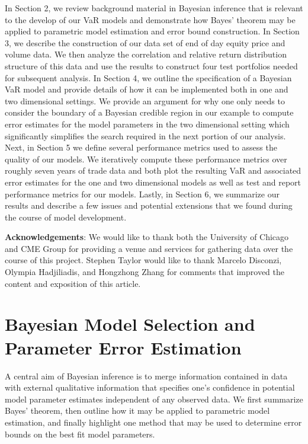 \documentclass{amsart}
\begin{document}
In Section 2, we review background material in Bayesian inference that is relevant to
the develop of our VaR models and demonstrate how Bayes' theorem 
may be applied to parametric model estimation and error bound construction. 
In Section 3, we describe the construction of our data set of 
end of day equity price and volume data.  We then analyze the correlation and relative return 
distribution structure of this 
data and use the results to construct four test portfolios needed for subsequent analysis. 
In Section 4, we outline the specification of a Bayesian VaR model and provide details 
of how it can be implemented both in one and two dimensional settings.  We provide an argument 
for why one only needs to consider the boundary of a Bayesian credible region in our example 
to compute error estimates for the model parameters in the two dimensional setting which significantly 
simplifies the search required in the next portion of our analysis.
Next, in Section 5 we define several performance metrics used to 
assess the quality of our models.  We iteratively compute these performance metrics 
over roughly seven years of trade data and both plot the resulting VaR and associated 
error estimates for the one and two dimensional models as well as test and report   
 performance metrics for our models. Lastly, in Section 6, we summarize our results and 
describe a few issues and potential extensions that we found during the course of model development. 

\textbf{Acknowledgements}: 
We would like to thank both the University of Chicago and CME Group for providing a 
venue and services for gathering data over the course of this project.  Stephen 
Taylor would like to thank Marcelo Disconzi, Olympia Hadjiliadis, and Hongzhong Zhang 
for comments that improved the content 
and exposition of this article. 

\section{Bayesian Model Selection and Parameter Error Estimation}

A central aim of Bayesian inference is to merge information contained in data with 
external qualitative information that specifies one's confidence in potential model 
parameter estimates independent of any observed data. 
We first summarize Bayes' 
theorem, then outline how it may be applied to parametric model estimation, and finally 
highlight one method that may be used to determine error bounds on the best fit model parameters. 
\end{document}

